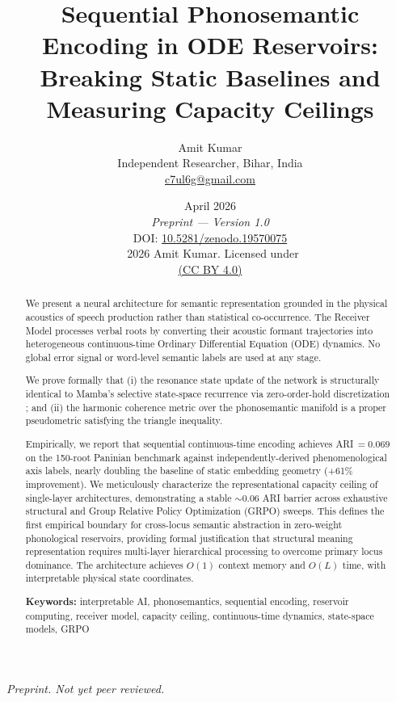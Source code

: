 \documentclass{article}
\title{\textbf{Sequential Phonosemantic Encoding in ODE Reservoirs:\\
Breaking Static Baselines and Measuring Capacity Ceilings}}
\author{Amit Kumar\\
\small Independent Researcher, Bihar, India\\
\small \href{mailto:c7ul6g@gmail.com}{c7ul6g@gmail.com}}
\date{%
  April 2026\\[4pt]
  \small\textit{Preprint — Version 1.0}\\[2pt]
  \small DOI: \href{https://doi.org/10.5281/zenodo.19570075}{10.5281/zenodo.19570075}\\[2pt]
  \small\textcopyright\ 2026 Amit Kumar. Licensed under\\
  \small\href{https://creativecommons.org/licenses/by/4.0/}{(CC BY 4.0)}%
}
\begin{document}
\maketitle

\begin{center}
\small\textit{Preprint. Not yet peer reviewed.}
\end{center}

\begin{abstract}
We present a neural architecture for semantic representation grounded in the physical acoustics of speech production rather than statistical co-occurrence. The Receiver Model processes verbal roots by converting their acoustic formant trajectories into heterogeneous continuous-time Ordinary Differential Equation (ODE) dynamics. No global error signal or word-level semantic labels are used at any stage.

We prove formally that (i) the resonance state update of the network is structurally identical to Mamba's selective state-space recurrence via zero-order-hold discretization \cite{gu2022mamba}; and (ii) the harmonic coherence metric over the phonosemantic manifold is a proper pseudometric satisfying the triangle inequality.

Empirically, we report that sequential continuous-time encoding achieves ARI\,$=0.069$ on the 150-root Paninian benchmark against independently-derived phenomenological axis labels, nearly doubling the baseline of static embedding geometry (+61\% improvement). We meticulously characterize the representational capacity ceiling of single-layer architectures, demonstrating a stable $\sim0.06$ ARI barrier across exhaustive structural and Group Relative Policy Optimization (GRPO) sweeps. This defines the first empirical boundary for cross-locus semantic abstraction in zero-weight phonological reservoirs, providing formal justification that structural meaning representation requires multi-layer hierarchical processing to overcome primary locus dominance. The architecture achieves $O(1)$ context memory and $O(L)$ time, with interpretable physical state coordinates.

\smallskip
\noindent\textbf{Keywords:} interpretable AI, phonosemantics, sequential encoding, reservoir computing, receiver model, capacity ceiling, continuous-time dynamics, state-space models, GRPO
\end{abstract}

\vspace{1em}
\end{document}
